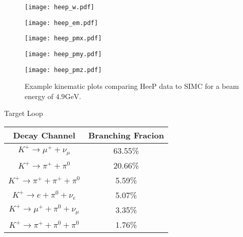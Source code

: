 \begin{figure}
  \centering
  \begin{minipage}[b]{0.48\linewidth}
    \texttt{[image: heep\_w.pdf]}
  \end{minipage}
  \hfill
  \begin{minipage}[b]{0.48\linewidth}
    \texttt{[image: heep\_em.pdf]}
  \end{minipage}
  
  \vspace{0.5cm}
  
  \begin{minipage}[b]{0.48\linewidth}
    \texttt{[image: heep\_pmx.pdf]}
  \end{minipage}
  \hfill
  \begin{minipage}[b]{0.48\linewidth}
    \texttt{[image: heep\_pmy.pdf]}
  \end{minipage}
  \hfill
  \begin{minipage}[b]{0.48\linewidth}
    \texttt{[image: heep\_pmz.pdf]}
  \end{minipage}  
  
  \caption{Example kinematic plots comparing HeeP data to SIMC for a beam energy of $4.9 \mathrm{GeV}$.}
  \label{fig:3-4_heep}
\end{figure}

%
%

\begin{Mtable}{Target Loop}
  \centering
  \begin{tabular}{|c|c|}
    \hline
    \textbf{Decay Channel} & \textbf{Branching Fracion} \\
    \hline
    $K^+\rightarrow \mu^++\nu_{\mu}$ & 63.55\% \\
    $K^+\rightarrow \pi^++\pi^0$ & 20.66\% \\
    $K^+\rightarrow \pi^++\pi^++\pi^0$ & 5.59\% \\
    $K^+\rightarrow e+\pi^0+\nu_e$ & 5.07\% \\
    $K^+\rightarrow \mu^++\pi^0+\nu_{\mu}$ & 3.35\% \\
    $K^+\rightarrow \pi^++\pi^0+\pi^0$ & 1.76\% \\
    \hline
    \end{tabular}
  \caption{Most probable decay channels of $K^+$ and their respective branching fractions. There are many decay channels for the kaon but these make up >99.98\% of the kaon decay's phase space.}
  \label{tab:4-5_kaon_decay}
\end{Mtable}

